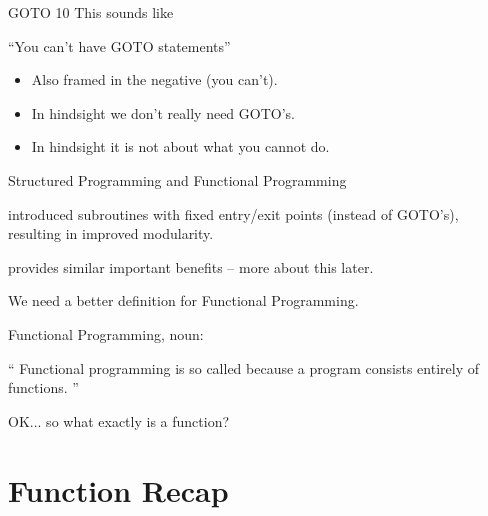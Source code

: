 \documentclass{beamer}
\begin{document}
\begin{frame}{GOTO 10}
    This sounds like
  \begin{exampleblock}{}
    {\Large ``You can't have GOTO statements''}
  \end{exampleblock}
  \vskip5mm
  \hspace*{}

  \begin{itemize}[<+->]
  \item Also framed in the negative (you can't).
  \item In hindsight we don't really need GOTO's.
  \item In hindsight it is not about what you cannot do.
  \end{itemize}
\end{frame}

\begin{frame}{Structured Programming and Functional Programming}
  \begin{description}[<+->]
  \item[Structured Programming] introduced subroutines with fixed
    entry/exit points (instead of GOTO's), resulting in improved
    modularity.
  \item[Functional Programming] provides similar important benefits --
    more about this later.
  \end{description}
\end{frame}

\begin{frame}{}

  {\Large We need a better definition for Functional Programming.}

\end{frame}

\begin{frame}{Functional Programming, noun:}

\begin{exampleblock}{}
  {\Large ``
  Functional programming is so called because a program consists entirely of functions.
  ''}
  \vskip5mm
  \hspace*{}
\end{exampleblock}
\end{frame}

\begin{frame}{}
OK... so what exactly is a function?
\end{frame}

\section{Function Recap}
\end{document}
